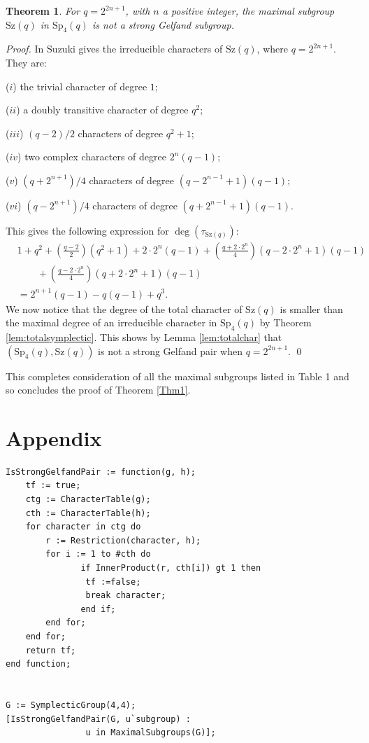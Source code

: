 \documentclass{amsart}
\newtheorem{thm}{Theorem}[section]
\begin{document}
\begin{thm}\label{thm:suz}
For $q=2^{2n+1}$, with $n$ a positive integer, the maximal subgroup $\mathrm{Sz}(q)$ in $\mathrm{Sp}_4(q)$ is not a strong Gelfand subgroup.
\end{thm}
\noindent\textit{Proof.} In \cite{Suz} Suzuki gives the irreducible characters of $\mathrm{Sz}(q)$, where $q=2^{2n+1}$. They are:

\noindent 
($i$)  the trivial character of degree $1$;

\noindent 
($ii$)  a doubly transitive character of degree $q^2$;

\noindent 
($iii$)  $(q-2)/2$ characters of degree $q^2+1$;

\noindent 
($iv$)  two complex characters of degree $2^n(q-1)$;

\noindent 
($v$)  $(q+2^{n+1})/4$ characters of degree $(q-2^{n-1}+1)(q-1)$;

\noindent 
($vi$)  $(q-2^{n+1})/4$ characters of degree $(q+2^{n-1}+1)(q-1)$.


This gives the following expression  for $\deg(\tau_{\mathrm{Sz}(q)})$:
\begin{align*}
&1+q^2+\left(\frac{q-2}{2}\right)\left(q^2+1\right) + 2\cdot 2^n\left(q-1\right)
+ \left(\frac{q+2\cdot 2^n}{4}\right)\left(q-2\cdot 2^n+1\right)\left(q-1\right)\\
&\qquad + \left(\frac{q-2\cdot 2^n}{4}\right)\left(q+2\cdot 2^n+1\right)\left(q-1\right)\\
& = 2^{n+1}(q-1)-q(q-1)+q^3.
\end{align*}
We now notice that the degree of the total character of $\mathrm{Sz}(q)$ is smaller than the maximal degree of an irreducible character in $\mathrm{Sp}_4(q)$ by Theorem  \ref{lem:totalsymplectic}. This shows by Lemma \ref{lem:totalchar} that $(\mathrm{Sp}_4(q), \mathrm{Sz}(q))$ is not a strong Gelfand pair when $q=2^{2n+1}$. \qed\medskip 


This completes consideration of all the  maximal subgroups
listed in Table 1 and so concludes the proof of Theorem 
\ref {Thm1}.



\section*{Appendix}
\begin{lstlisting}
IsStrongGelfandPair := function(g, h);
	tf := true;
	ctg := CharacterTable(g);
	cth := CharacterTable(h);
	for character in ctg do
		r := Restriction(character, h);
		for i := 1 to #cth do
		       if InnerProduct(r, cth[i]) gt 1 then 
				tf :=false;
				break character;
		       end if;
		end for;
	end for;
	return tf;
end function;


G := SymplecticGroup(4,4);
[IsStrongGelfandPair(G, u`subgroup) : 
				u in MaximalSubgroups(G)];
\end{lstlisting}
\end{document}
